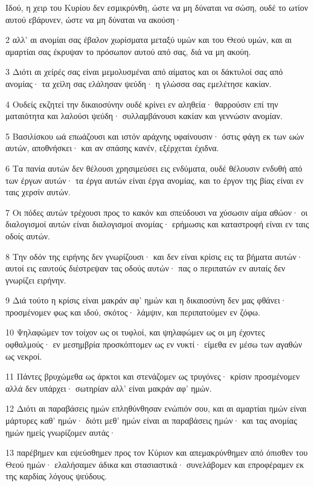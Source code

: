 \par Ιδού, η χειρ του Κυρίου δεν εσμικρύνθη, ώστε να μη δύναται να σώση, ουδέ το ωτίον αυτού εβάρυνεν, ώστε να μη δύναται να ακούση·
\par 2 αλλ' αι ανομίαι σας έβαλον χωρίσματα μεταξύ υμών και του Θεού υμών, και αι αμαρτίαι σας έκρυψαν το πρόσωπον αυτού από σας, διά να μη ακούη.
\par 3 Διότι αι χείρές σας είναι μεμολυσμέναι από αίματος και οι δάκτυλοί σας από ανομίας· τα χείλη σας ελάλησαν ψεύδη· η γλώσσα σας εμελέτησε κακίαν.
\par 4 Ουδείς εκζητεί την δικαιοσύνην ουδέ κρίνει εν αληθεία· θαρρούσιν επί την ματαιότητα και λαλούσι ψεύδη· συλλαμβάνουσι κακίαν και γεννώσιν ανομίαν.
\par 5 Βασιλίσκου ωά επωάζουσι και ιστόν αράχνης υφαίνουσιν· όστις φάγη εκ των ωών αυτών, αποθνήσκει· και αν σπάσης κανέν, εξέρχεται έχιδνα.
\par 6 Τα πανία αυτών δεν θέλουσι χρησιμεύσει εις ενδύματα, ουδέ θέλουσιν ενδυθή από των έργων αυτών· τα έργα αυτών είναι έργα ανομίας, και το έργον της βίας είναι εν ταις χερσίν αυτών.
\par 7 Οι πόδες αυτών τρέχουσι προς το κακόν και σπεύδουσι να χύσωσιν αίμα αθώον· οι διαλογισμοί αυτών είναι διαλογισμοί ανομίας· ερήμωσις και καταστροφή είναι εν ταις οδοίς αυτών.
\par 8 Την οδόν της ειρήνης δεν γνωρίζουσι· και δεν είναι κρίσις εις τα βήματα αυτών· αυτοί εις εαυτούς διέστρεψαν τας οδούς αυτών· πας ο περιπατών εν αυταίς δεν γνωρίζει ειρήνην.
\par 9 Διά τούτο η κρίσις είναι μακράν αφ' ημών και η δικαιοσύνη δεν μας φθάνει· προσμένομεν φως και ιδού, σκότος· λάμψιν, και περιπατούμεν εν ζόφω.
\par 10 Ψηλαφώμεν τον τοίχον ως οι τυφλοί, και ψηλαφώμεν ως οι μη έχοντες οφθαλμούς· εν μεσημβρία προσκόπτομεν ως εν νυκτί· είμεθα εν μέσω των αγαθών ως νεκροί.
\par 11 Πάντες βρυχώμεθα ως άρκτοι και στενάζομεν ως τρυγόνες· κρίσιν προσμένομεν αλλά δεν υπάρχει· σωτηρίαν αλλ' είναι μακράν αφ' ημών.
\par 12 Διότι αι παραβάσεις ημών επληθύνθησαν ενώπιόν σου, και αι αμαρτίαι ημών είναι μάρτυρες καθ' ημών· διότι μεθ' ημών είναι αι παραβάσεις ημών· και τας ανομίας ημών ημείς γνωρίζομεν αυτάς·
\par 13 παρέβημεν και εψεύσθημεν προς τον Κύριον και απεμακρύνθημεν από όπισθεν του Θεού ημών· ελαλήσαμεν άδικα και στασιαστικά· συνελάβομεν και επροφέραμεν εκ της καρδίας λόγους ψεύδους.
